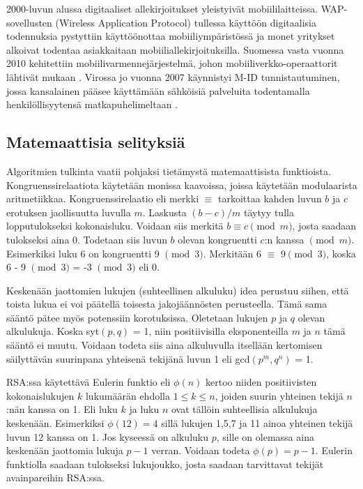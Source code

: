 \documentclass[finnish]{tktltiki2}
\theoremstyle{definition}
\theoremstyle{remark}
\begin{document}
2000-luvun alussa digitaaliset allekirjoitukset yleistyivät mobiililaitteissa. WAP-sovellusten (Wireless Application Protocol) tullessa käyttöön digitaalisia todennuksia pystyttiin käyttöönottaa mobiiliympäristössä ja monet yritykset alkoivat todentaa asiakkaitaan mobiiliallekirjoituksilla. Suomessa vasta vuonna 2010 kehitettiin mobiilivarmennejärjestelmä, johon mobiiliverkko-operaattorit lähtivät mukaan \cite{mobiva}. Virossa jo vuonna 2007 käynnistyi M-ID tunnistautuminen, jossa kansalainen pääsee käyttämään sähköisiä palveluita todentamalla henkilöllisyytensä matkapuhelimeltaan \cite{estonia}. 

\subsection{Matemaattisia selityksiä}

Algoritmien tulkinta vaatii pohjaksi tietämystä matemaattisista funktioista. Kongruenssirelaatiota käytetään monissa kaavoissa, joissa käytetään modulaarista aritmetiikkaa. Kongruenssirelaatio eli merkki $\equiv$ tarkoittaa kahden luvun $b$ ja $c$ erotuksen jaollisuutta luvulla $m$. Laskusta $(b - c)/m$ täytyy tulla lopputulokseksi kokonaisluku. Voidaan siis merkitä $b \equiv c \pmod{m}$, josta saadaan tulokseksi aina 0. Todetaan siis luvun $b$ olevan kongruentti $c$:n kanssa $\pmod{m}$. Esimerkiksi luku 6 on kongruentti 9 $\pmod{3}$. Merkitään 6 $\equiv $ 9$ \pmod{3}$, koska 6 - 9 $\pmod{3}$ = -3 $\pmod{3}$ eli 0. \cite{cong}

Keskenään jaottomien lukujen (suhteellinen alkuluku) idea perustuu siihen, että toista lukua ei voi päätellä toisesta jakojäännösten perusteella. Tämä sama sääntö pätee myös potenssiin korotuksissa. Oletetaan lukujen $p$ ja $q$ olevan alkulukuja. Koska syt$(p, q)$ = 1, niin positiivisilla eksponenteilla $m$ ja $n$ tämä sääntö ei muutu. Voidaan todeta siis aina alkuluvulla itsellään kertomisen säilyttävän suurinpana yhteisenä tekijänä luvun 1 eli gcd$(p^m, q^n)$ = 1. \cite{rel}  

RSA:ssa käytettävä Eulerin funktio eli $\phi(n)$ kertoo niiden positiivisten kokonaislukujen $k$ lukumäärän ehdolla $1 \leq k \leq n$, joiden suurin yhteinen tekijä $n$:nän kanssa on 1. Eli luku $k$ ja luku $n$ ovat tällöin suhteellisia alkulukuja keskenään. Esimerkiksi $\phi(12) = 4$ sillä lukujen 1,5,7 ja 11 ainoa yhteinen tekijä luvun 12 kanssa on 1. Jos kyseessä on alkuluku $p$, sille on olemassa aina  keskenään jaottomia lukuja $p - 1$ verran. Voidaan todeta $\phi(p) = p -1$. Eulerin funktiolla saadaan tulokseksi lukujoukko, josta saadaan tarvittavat tekijät avainpareihin RSA:ssa. \cite{tot}
	
\end{document}
